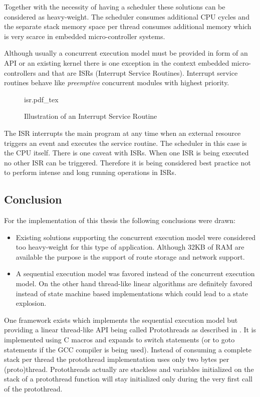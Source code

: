 Together with the necessity of having a scheduler these solutions can be considered as heavy-weight. The scheduler consumes additional CPU cycles and the separate stack memory space per thread consumes additional memory which is very scarce in embedded micro-controller systems.

Although usually a concurrent execution model must be provided in form of an API or an existing kernel there is one exception in the context embedded micro-controllers and that are ISRs (Interrupt Service Routines). Interrupt service routines behave like \emph{preemptive} concurrent modules with highest priority.

\begin{figure}[H]
\centering
{isr.pdf_tex}
\caption{Illustration of an Interrupt Service Routine}
\end{figure}

The ISR interrupts the main program at any time when an external resource triggers an event and executes the service routine. The scheduler in this case is the CPU itself. There is one caveat with ISRs. When one ISR is being executed no other ISR can be triggered. Therefore it is being considered best practice not to perform intense and long running operations in ISRs.

\subsection{Conclusion}
For the implementation of this thesis the following conclusions were drawn:

\begin{itemize}
\item Existing solutions supporting the concurrent execution model were considered too heavy-weight for this type of application. Although 32KB of RAM are available the purpose is the support of route storage and network support.
\item A sequential execution model was favored instead of the concurrent execution model. On the other hand thread-like linear algorithms are definitely favored instead of state machine based implementations which could lead to a state explosion.
\end{itemize}

One framework exists which implements the sequential execution model but providing a linear thread-like API being called Protothreads as described in \cite{dunkels}. It is implemented using C macros and expands to switch statements (or to goto statements if the GCC compiler is being used). Instead of consuming a complete stack per thread the protothread implementation uses only two bytes per (proto)thread. Protothreads actually are stackless and variables initialized on the stack of a protothread function will stay initialized only during the very first call of the protothread.

